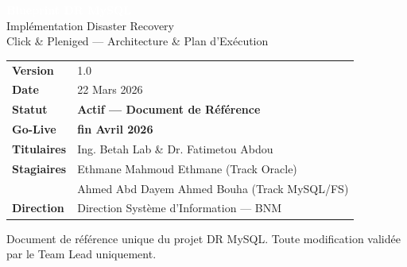 \documentclass[a4paper,11pt]{article}
\begin{document}

\vspace*{1cm}
\begin{center}
  {\Huge\bfseries\textcolor{white}{Blueprint DR MySQL}}\\[0.5em]
  {\large\textcolor{white!80!bnmlightblue}{Implémentation Disaster Recovery}}\\[0.3em]
  {\large\textcolor{white!80!bnmlightblue}{Click \& Pleniged — Architecture \& Plan d'Exécution}}\\[2.5cm]
\end{center}

\begin{center}
\begin{tabular}{ll}
  \textbf{\textcolor{bnmblue}{Version}}   & 1.0\\
  \textbf{\textcolor{bnmblue}{Date}}      & 22 Mars 2026\\
  \textbf{\textcolor{bnmblue}{Statut}}    & \textcolor{bnmgreen}{\textbf{Actif — Document de Référence}}\\
  \textbf{\textcolor{bnmblue}{Go-Live}}   & \textcolor{bnmred}{\textbf{fin Avril 2026}}\\
  \textbf{\textcolor{bnmblue}{Titulaires}}& Ing. Betah Lab \& Dr. Fatimetou Abdou\\
  \textbf{\textcolor{bnmblue}{Stagiaires}}& Ethmane Mahmoud Ethmane (Track Oracle)\\
                                           & Ahmed Abd Dayem Ahmed Bouha (Track MySQL/FS)\\
  \textbf{\textcolor{bnmblue}{Direction}} & Direction Système d'Information — BNM\\
\end{tabular}
\end{center}

\vspace{1cm}
\begin{center}
  \textcolor{bnmgray}{\small Document de référence unique du projet DR MySQL. Toute modification validée par le Team Lead uniquement.}
\end{center}
\end{document}
